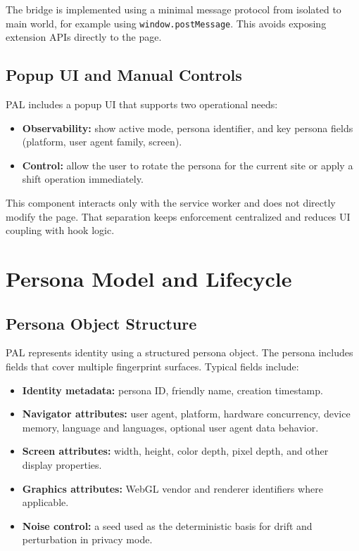 \documentclass[11pt]{report}
\begin{document}
The bridge is implemented using a minimal message protocol from isolated to main world, for example using \texttt{window.postMessage}. This avoids exposing extension APIs directly to the page.

\subsection{Popup UI and Manual Controls}

PAL includes a popup UI that supports two operational needs:

\begin{itemize}
    \item \textbf{Observability:} show active mode, persona identifier, and key persona fields (platform, user agent family, screen).
    \item \textbf{Control:} allow the user to rotate the persona for the current site or apply a shift operation immediately.
\end{itemize}

This component interacts only with the service worker and does not directly modify the page. That separation keeps enforcement centralized and reduces UI coupling with hook logic.

\section{Persona Model and Lifecycle}

\subsection{Persona Object Structure}

PAL represents identity using a structured persona object. The persona includes fields that cover multiple fingerprint surfaces. Typical fields include:

\begin{itemize}
    \item \textbf{Identity metadata:} persona ID, friendly name, creation timestamp.
    \item \textbf{Navigator attributes:} user agent, platform, hardware concurrency, device memory, language and languages, optional user agent data behavior.
    \item \textbf{Screen attributes:} width, height, color depth, pixel depth, and other display properties.
    \item \textbf{Graphics attributes:} WebGL vendor and renderer identifiers where applicable.
    \item \textbf{Noise control:} a seed used as the deterministic basis for drift and perturbation in privacy mode.
\end{itemize}
\end{document}
